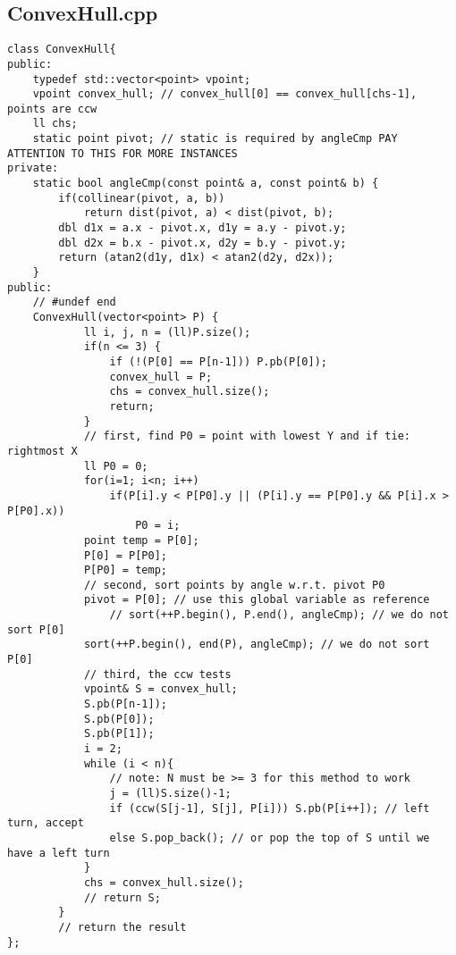 \documentclass[a4paper,landscape,8pt]{extarticle}
\begin{document}
\begin{multicols}{3}
%
%
%

\section*{ConvexHull.cpp}

\begin{lstlisting}
class ConvexHull{
public:
    typedef std::vector<point> vpoint;
    vpoint convex_hull; // convex_hull[0] == convex_hull[chs-1], points are ccw
    ll chs;
    static point pivot; // static is required by angleCmp PAY ATTENTION TO THIS FOR MORE INSTANCES
private:
    static bool angleCmp(const point& a, const point& b) {
        if(collinear(pivot, a, b))
            return dist(pivot, a) < dist(pivot, b);
        dbl d1x = a.x - pivot.x, d1y = a.y - pivot.y;
        dbl d2x = b.x - pivot.x, d2y = b.y - pivot.y;
        return (atan2(d1y, d1x) < atan2(d2y, d2x));
    }
public:
    // #undef end
    ConvexHull(vector<point> P) {
            ll i, j, n = (ll)P.size();
            if(n <= 3) {
                if (!(P[0] == P[n-1])) P.pb(P[0]);
                convex_hull = P;
                chs = convex_hull.size();
                return;
            }
            // first, find P0 = point with lowest Y and if tie: rightmost X
            ll P0 = 0;
            for(i=1; i<n; i++)
                if(P[i].y < P[P0].y || (P[i].y == P[P0].y && P[i].x > P[P0].x))
                    P0 = i;
            point temp = P[0];
            P[0] = P[P0];
            P[P0] = temp;
            // second, sort points by angle w.r.t. pivot P0
            pivot = P[0]; // use this global variable as reference
                // sort(++P.begin(), P.end(), angleCmp); // we do not sort P[0]
            sort(++P.begin(), end(P), angleCmp); // we do not sort P[0]
            // third, the ccw tests
            vpoint& S = convex_hull;
            S.pb(P[n-1]);
            S.pb(P[0]);
            S.pb(P[1]);
            i = 2;
            while (i < n){
                // note: N must be >= 3 for this method to work
                j = (ll)S.size()-1;
                if (ccw(S[j-1], S[j], P[i])) S.pb(P[i++]); // left turn, accept
                else S.pop_back(); // or pop the top of S until we have a left turn
            }
            chs = convex_hull.size();
            // return S;
        }
        // return the result
};


\end{lstlisting}
\end{multicols}
\end{document}
